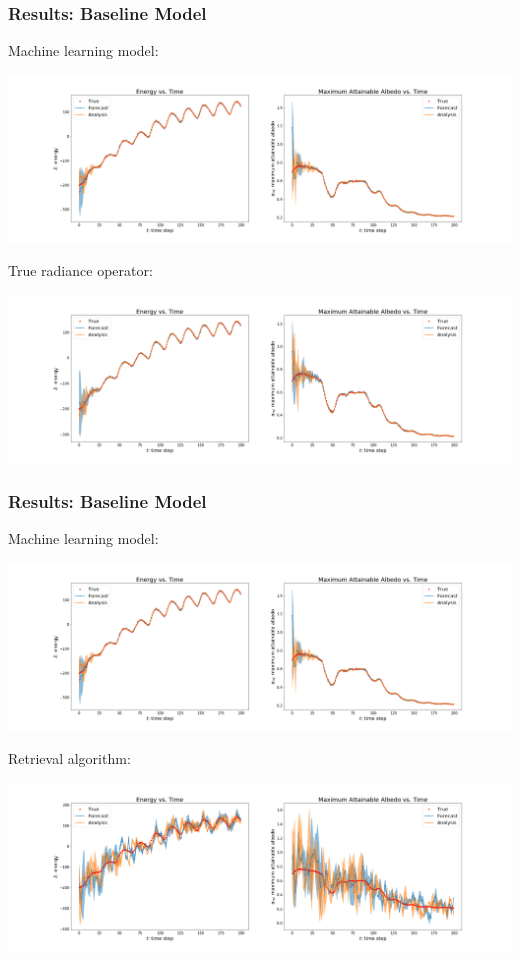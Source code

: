 \documentclass{beamer}
\begin{document}
\begin{frame}
\frametitle{Results: Baseline Model}
{\setlength{\baselineskip}{0.001em}
\tiny{Machine learning model:}
\begin{center}
\includegraphics[width=0.85\linewidth]{Figures/H_ml_hat_grid_new.png} 
\end{center}
\tiny{True radiance operator:}
\begin{center}
\includegraphics[width=0.85\linewidth]{Figures/H_true_new.png} 
\end{center}
}
\end{frame}

\begin{frame}
\frametitle{Results: Baseline Model}
{\setlength{\baselineskip}{0.001em}
\tiny{Machine learning model:}
\begin{center}
\includegraphics[width=0.85\linewidth]{Figures/H_ml_hat_grid_new.png} 
\end{center}
\tiny{Retrieval algorithm:}
\begin{center}
\includegraphics[width=0.85\linewidth]{Figures/H_retrieval_new.png} 
\end{center}
}
\end{frame}
\end{document}

